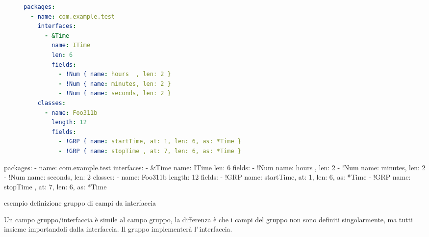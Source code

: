 \ifesource
\begin{figure*}[!htb]
\begin{lstlisting}[language=yaml, 
caption={esempio definizione gruppo di campi da interfaccia}, 
label=lst:xmplIGrp]
packages:
  - name: com.example.test
    interfaces:
      - &Time
        name: ITime
        len: 6
        fields:
          - !Num { name: hours  , len: 2 }
          - !Num { name: minutes, len: 2 }
          - !Num { name: seconds, len: 2 }
    classes:
      - name: Foo311b
        length: 12
        fields:
          - !GRP { name: startTime, at: 1, len: 6, as: *Time }
          - !GRP { name: stopTime , at: 7, len: 6, as: *Time }
\end{lstlisting}
\end{figure*}
\else
\begin{elisting}[!htb]
\begin{yamlcode}
packages:
  - name: com.example.test
    interfaces:
      - &Time
        name: ITime
        len: 6
        fields:
          - !Num { name: hours  , len: 2 }
          - !Num { name: minutes, len: 2 }
          - !Num { name: seconds, len: 2 }
    classes:
      - name: Foo311b
        length: 12
        fields:
          - !GRP { name: startTime, at: 1, len: 6, as: *Time }
          - !GRP { name: stopTime , at: 7, len: 6, as: *Time }
\end{yamlcode}
\caption{esempio definizione gruppo di campi da interfaccia}
\label{lst:xmplIGrp}
\end{elisting}
\fi
Un campo gruppo/interfaccia è simile al campo gruppo, la differenza è che i
campi del gruppo non sono definiti singolarmente, ma tutti insieme importandoli
dalla interfaccia. Il gruppo implementerà l'\,interfaccia.

